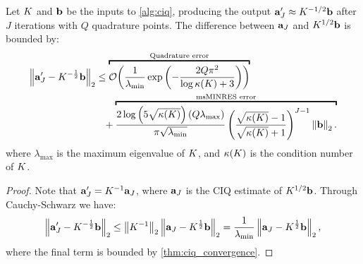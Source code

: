 \begin{corollary}
  Let $K$ and $\mathbf{b}$ be the inputs to \cref{alg:ciq}, producing the output $\mathbf{a}_J' \approx K^{-1/2} \mathbf{b}$ after $J$ iterations with $Q$ quadrature points.
  The difference between $\mathbf{a}_J$ and $K^{1/2} \mathbf{b}$ is bounded by:
  \begin{align*}
    \left\Vert \ba_J' - \bK^{-\frac 1 2} \bb \right\Vert_2
    &\leq
    \overbracket{
      \bigo{\frac{1}{\lambda_\text{min}} \exp\left( -\frac  {2 Q \pi^2}{\log \kappa(\bK) + 3} \right)}
    }^{\text{Quadrature error}}
    \\
    &\phantom{=} +
    \overbracket{
      \frac{ 2 \log \left( 5 \sqrt{\kappa(\bK)} \right)  \left( Q \lambda_\text{max} \right) }{\pi \sqrt{\lambda_\text{min}}}
      \left( \frac{ \sqrt{\kappa(\bK)} - 1}{ \sqrt{\kappa(\bK)} + 1} \right)^{J-1}
      \left\Vert \bb \right\Vert_2.
    }^{\text{msMINRES error}}
  \end{align*}
  where $\lambda_\text{max}$ is the maximum eigenvalue of $K$, and $\kappa(K)$ is the condition number of $K$.
  \label{thm:ciq_convergence_inverse}
\end{corollary}

\begin{proof}
  Note that $\mathbf{a}_J' = K^{-1} \mathbf{a}_J$, where $\mathbf{a}_J$ is the CIQ estimate of $K^{1/2} \mathbf{b}$.
  Through Cauchy-Schwarz we have:
  \[
    \left\Vert \mathbf{a}_J' - K^{-\frac 1 2} \mathbf{b} \right\Vert_2
    \leq \left\Vert K^{-1} \right\Vert_2 \left\Vert \mathbf{a}_J - K^{\frac 1 2} \mathbf{b} \right\Vert_2
    = \frac{1}{\lambda_\text{min}} \left\Vert \mathbf{a}_J - K^{\frac 1 2} \mathbf{b} \right\Vert_2,
  \]
  where the final term is bounded by \cref{thm:ciq_convergence}.
\end{proof}
